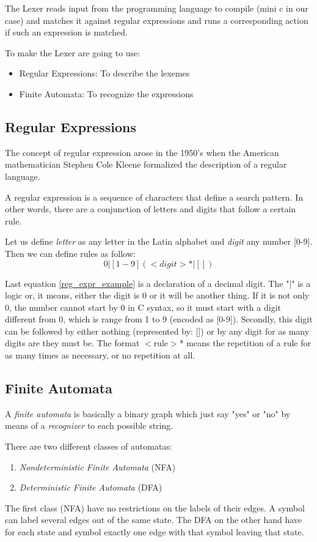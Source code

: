 \documentclass[conference]{IEEEtran}
\begin{document}
The Lexer reads input from the programming language to compile (mini c in our case) and matches it against regular expressions and runs a corresponding action if such an expression is matched.

To make the Lexer are going to use:
\begin{itemize}
	\item Regular Expressions: To describe the lexemes
	\item Finite Automata: To recognize the expressions
\end{itemize}
\subsection{Regular Expressions}
The concept of regular expression arose in the 1950's when the American mathematician Stephen Cole Kleene formalized the description of a regular language.

A regular expression is a sequence of characters that define a search pattern. In other words, there are a conjunction of letters and digits that follow a certain rule.

Let us define \textit{letter} as any letter in the Latin alphabet and \textit{digit} any number [0-9]. Then we can define rules as follow: 
\begin{equation}
0 | [1-9] (<digit>* | [])\label{reg_expr_example}
\end{equation}

Last equation \ref{reg_expr_example} is a declaration of a decimal digit. The "$|$" is a logic or, it means, either the digit is 0 or it will be another thing. If it is not only 0, the number cannot start by 0 in C syntax, so it must start with a digit different from 0, which is range from 1 to 9 (encoded as [0-9]). Secondly, this digit can be followed by either nothing (represented by: []) or by any digit for as many digits are they must be. The format $<$rule$>$* means the repetition of a rule for as many times as necessary, or no repetition at all.

\subsection{Finite Automata}
A \textit{finite automata} is basically a binary graph which just say "yes" or "no" by means of a \textit{recognizer} to each possible string.

There are two different classes of automatas:
\begin{enumerate}
	\item \textit{Nondeterministic Finite Automata} (NFA)
	\item \textit{Deterministic Finite Automata} (DFA)
\end{enumerate}
The first class (NFA) have no restrictions on the labels of their edges. A symbol can label several edges out of the same state. The DFA on the other hand have for each state and symbol exactly one edge with that symbol leaving that state. 
\end{document}

